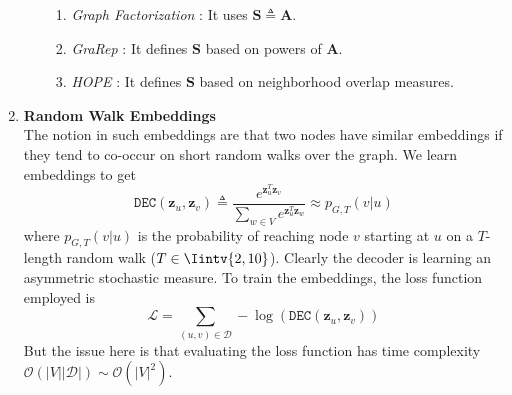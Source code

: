 \begin{enumerate}
\begin{enumerate}
\begin{enumerate}
	\item \textit{Graph Factorization} \cite{graph-factorization}: It uses $\mathbf{S} \triangleq \mathbf{A}$.
	\item \textit{GraRep} \cite{grarep}: It defines $\mathbf{S}$ based on powers of $\mathbf{A}$.
	\item \textit{HOPE} \cite{hope}: It defines $\mathbf{S}$ based on neighborhood overlap measures.
\end{enumerate}
\end{enumerate}
\item \textbf{Random Walk Embeddings} \\
The notion in such embeddings are that two nodes have similar embeddings if they tend to co-occur on short random walks over the graph. We learn embeddings to get
\begin{equation} \label{eq:random-walk-decoder}
\texttt{DEC}(\mathbf{z}_u, \mathbf{z}_v) \triangleq \dfrac{e^{\mathbf{z}_u^T \mathbf{z}_v}}{\sum_{w \in V} e^{\mathbf{z}_u^T \mathbf{z}_w}} \approx p_{G, T}(v|u)
\end{equation}
where $p_{G,T}(v|u)$ is the probability of reaching node $v$ starting at $u$ on a $T$-length random walk ($T \in \Iintv{2, 10}$). Clearly the decoder is learning an asymmetric stochastic measure. To train the embeddings, the loss function employed is
\begin{equation}
\mathcal{L} = \sum_{(u,v) \in \mathcal{D}} -\log(\texttt{DEC}(\mathbf{z}_u, \mathbf{z}_v))
\end{equation}
But the issue here is that evaluating the loss function has time complexity $\mathcal{O}(|V||\mathcal{D}|) \sim \mathcal{O}(|V|^2)$.
\begin{enumerate}

\end{enumerate}
\end{enumerate}
